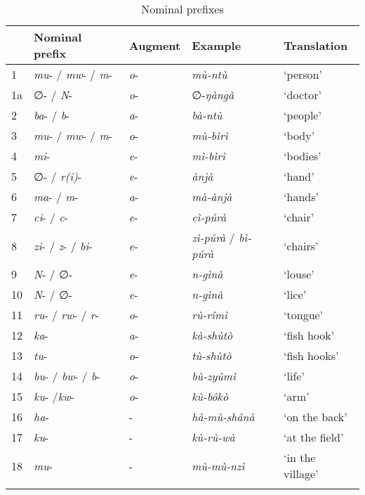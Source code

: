 \begin{table}
\label{bkm:Ref488751330}\caption{\label{tab:4:2}Nominal prefixes}
\begin{tabular}{lllll}
\lsptoprule
& Nominal prefix & Augment & Example & Translation\\
\midrule
1 & \textit{mu}- / \textit{mw}- / \textit{m}- & \textit{o}- & \textit{mù-ntù} & ‘person’\\
1a & ∅- / \textit{N}- & \textit{o}- & ∅-\textit{ŋàngà} & ‘doctor’\\
2 & \textit{ba}- / \textit{b}- & \textit{a}- & \textit{bà-ntù} & ‘people’\\
3 & \textit{mu}- / \textit{mw}- / \textit{m}- & \textit{o}- & \textit{mù-bìrì} & ‘body’\\
4 & \textit{mi}- & \textit{e}- & \textit{mì-bìrì} & ‘bodies’\\
5 & ∅- / \textit{r(i)}- & \textit{e}- & \textit{ànjà} & ‘hand’\\
6 & \textit{ma}- / \textit{m}- & \textit{a}- & \textit{mà-ànjà} & ‘hands’\\
7 & \textit{ci}- / \textit{c}- & \textit{e}- & \textit{cì-púrà} & ‘chair’\\
8 & \textit{zi}- / \textit{z}- / \textit{bi}- & \textit{e}- & \textit{zì-púrà} / \textit{bì-púrà} & ‘chairs’\\
9 & \textit{N}- / ∅- & \textit{e}- & \textit{n-gìnà} & ‘louse’\\
10 & \textit{N}- / ∅- & \textit{e}- & \textit{n-gìnà} & ‘lice’\\
11 & \textit{ru}- / \textit{rw}- / \textit{r}- & \textit{o}- & \textit{rù-rîmì} & ‘tongue’\\
12 & \textit{ka}- & \textit{a}- & \textit{kà-shùtò} & ‘fish hook’\\
13 & \textit{tu}- & \textit{o}- & \textit{tù-shùtò} & ‘fish hooks’\\
14 & \textit{bu}- / \textit{bw}- / \textit{b}- & \textit{o}- & \textit{bù-zyûmì} & ‘life’\\
15 & \textit{ku}- /\textit{kw}- & \textit{o}- & \textit{kù-bôkò} & ‘arm’\\
16 & \textit{ha}- & - & \textit{hà-mù-shânà} & ‘on the back’\\
17 & \textit{ku}- & - & \textit{kù-rù-wà} & ‘at the field’\\
18 & \textit{mu}- & - & \textit{mù-mù-nzì} & ‘in the village’\\
\lspbottomrule
\end{tabular}
\end{table}

